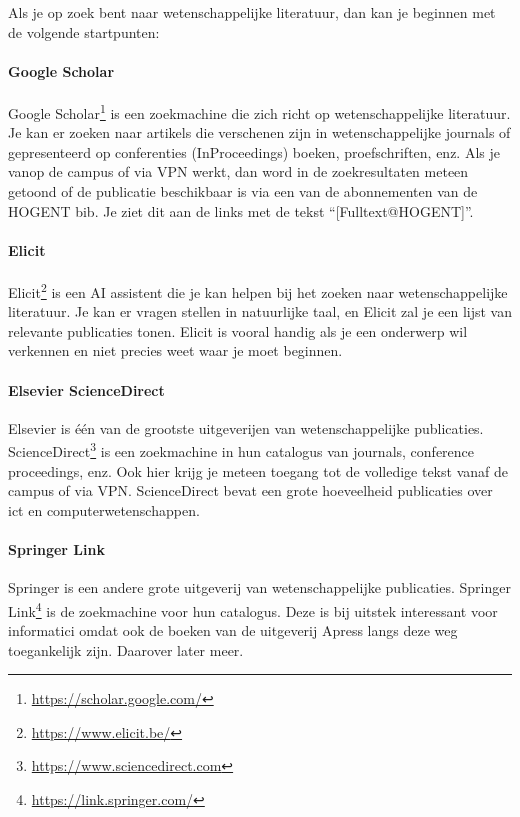 Als je op zoek bent naar wetenschappelijke literatuur, dan kan je beginnen met de volgende startpunten:

\paragraph{Google Scholar}

Google Scholar\footnote{\url{https://scholar.google.com/}} is een zoekmachine die zich richt op wetenschappelijke literatuur. Je kan er zoeken naar artikels die verschenen zijn in wetenschappelijke journals of gepresenteerd op conferenties (InProceedings) boeken, proefschriften, enz. Als je vanop de campus of via VPN werkt, dan word in de zoekresultaten meteen getoond of de publicatie beschikbaar is via een van de abonnementen van de HOGENT bib. Je ziet dit aan de links met de tekst ``[Fulltext@HOGENT]''.

\paragraph{Elicit}

Elicit\footnote{\url{https://www.elicit.be/}} is een AI assistent die je kan helpen bij het zoeken naar wetenschappelijke literatuur. Je kan er vragen stellen in natuurlijke taal, en Elicit zal je een lijst van relevante publicaties tonen. Elicit is vooral handig als je een onderwerp wil verkennen en niet precies weet waar je moet beginnen.

\paragraph{Elsevier ScienceDirect}

Elsevier is één van de grootste uitgeverijen van wetenschappelijke publicaties. ScienceDirect\footnote{\url{https://www.sciencedirect.com}} is een zoekmachine in hun catalogus van journals, conference proceedings, enz. Ook hier krijg je meteen toegang tot de volledige tekst vanaf de campus of via VPN. ScienceDirect bevat een grote hoeveelheid publicaties over ict en computerwetenschappen.

\paragraph{Springer Link}

Springer is een andere grote uitgeverij van wetenschappelijke publicaties. Springer Link\footnote{\url{https://link.springer.com/}} is de zoekmachine voor hun catalogus. Deze is bij uitstek interessant voor informatici omdat ook de boeken van de uitgeverij Apress langs deze weg toegankelijk zijn. Daarover later meer.

